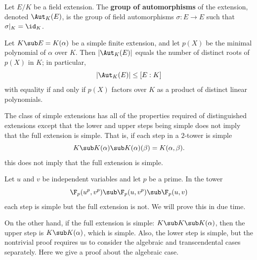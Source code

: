 \begin{definition}
Let $E/K$ be a field extension. The \textbf{group of automorphisms} of the extension, denoted $\Aut_K(E)$, is the group of field automorphisms $\sigma:E\to E$ such that $\sigma|_K=\id_K$.
\end{definition}
\begin{corollary}\label{field simple ext order of Aut}
Let $K\sub E=K(\alpha)$ be a simple finite extension, and let $p(X)$ be the minimal polynomial of $\alpha$ over $K$. Then $|\Aut_K(E)|$ equals the number of distinct roots of $p(X)$ in $K$; in particular,
\[|\Aut_K(E)|\leq[E:K]\]
with equality if and only if $p(X)$ factors over $K$ as a product of distinct linear polynomials.
\end{corollary}
The class of simple extensions has all of the properties required of distinguished extensions except that the lower and upper steps being simple does not imply that the full extension is simple. That is, if each step in a $2$-tower is simple
\[K\sub K(\alpha)\sub K(\alpha)(\beta)=K(\alpha,\beta).\]
this does not imply that the full extension is simple.
\begin{example}
Let $u$ and $v$ be independent variables and let $p$ be a prime. In the
tower
\[\F_p(u^p,v^p)\sub\F_p(u,v^p)\sub\F_p(u,v)\]
each step is simple but the full extension is not. We will prove this in due time.
\end{example}
On the other hand, if the full extension is simple: $K\sub K\sub K(\alpha)$, then the upper step is $K\sub K(\alpha)$, which is simple. Also, the lower step is simple, but the nontrivial proof requires us to consider the algebraic and transcendental cases separately. Here we give a proof about the algebraic case.\par

